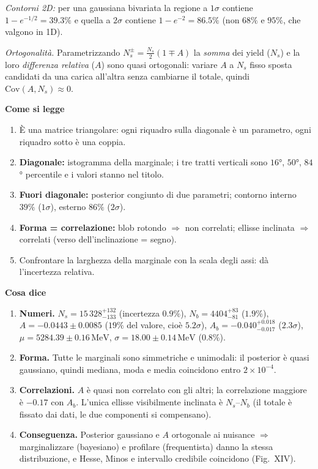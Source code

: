\documentclass[10.5pt,a4paper]{article}
\newcommand{\MeV}{\,\mathrm{MeV}}
\newcommand{\sez}[1]{\par\Needspace{6\baselineskip}\medskip\noindent\textbf{\large #1}\par\nopagebreak\smallskip}
\begin{document}
\emph{Contorni 2D:} per una gaussiana bivariata la regione a $1\sigma$ contiene $1-e^{-1/2}=39.3\%$ e quella a $2\sigma$ contiene $1-e^{-2}=86.5\%$ (non $68\%$ e $95\%$, che valgono in 1D).

\emph{Ortogonalità.} Parametrizzando $N_s^\pm=\tfrac{N_s}{2}(1\mp A)$ la \emph{somma} dei yield ($N_s$) e la loro \emph{differenza relativa} ($A$) sono quasi ortogonali: variare $A$ a $N_s$ fisso sposta candidati da una carica all'altra senza cambiarne il totale, quindi $\mathrm{Cov}(A,N_s)\approx0$.

\sez{Come si legge}
\begin{enumerate}
\item È una matrice triangolare: ogni riquadro sulla diagonale è un parametro, ogni riquadro sotto è una coppia.
\item \textbf{Diagonale:} istogramma della marginale; i tre tratti verticali sono $16$°, $50$°, $84$° percentile e i valori stanno nel titolo.
\item \textbf{Fuori diagonale:} posterior congiunto di due parametri; contorno interno $39\%$ ($1\sigma$), esterno $86\%$ ($2\sigma$).
\item \textbf{Forma = correlazione:} blob rotondo $\Rightarrow$ non correlati; ellisse inclinata $\Rightarrow$ correlati (verso dell'inclinazione = segno).
\item Confrontare la larghezza della marginale con la scala degli assi: dà l'incertezza relativa.
\end{enumerate}

\sez{Cosa dice}
\begin{enumerate}
\item \textbf{Numeri.} $N_s=15\,328^{+132}_{-133}$ (incertezza $0.9\%$), $N_b=4404^{+83}_{-81}$ ($1.9\%$), $A=-0.0443\pm0.0085$ ($19\%$ del valore, cioè $5.2\sigma$), $A_b=-0.040^{+0.018}_{-0.017}$ ($2.3\sigma$), $\mu=5284.39\pm0.16\MeV$, $\sigma=18.00\pm0.14\MeV$ ($0.8\%$).
\item \textbf{Forma.} Tutte le marginali sono simmetriche e unimodali: il posterior è quasi gaussiano, quindi mediana, moda e media coincidono entro $2\times10^{-4}$.
\item \textbf{Correlazioni.} $A$ è quasi non correlato con gli altri; la correlazione maggiore è $-0.17$ con $A_b$. L'unica ellisse visibilmente inclinata è $N_s$--$N_b$ (il totale è fissato dai dati, le due componenti si compensano).
\item \textbf{Conseguenza.} Posterior gaussiano e $A$ ortogonale ai nuisance $\Rightarrow$ marginalizzare (bayesiano) e profilare (frequentista) danno la stessa distribuzione, e Hesse, Minos e intervallo credibile coincidono (Fig.~XIV).
\end{enumerate}
\end{document}
